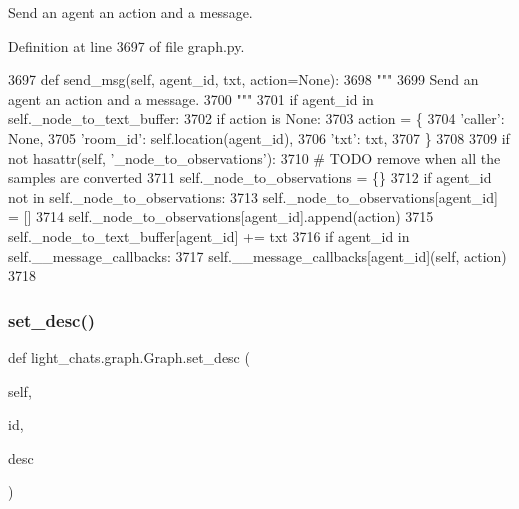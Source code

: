 \begin{DoxyVerb}Send an agent an action and a message.
\end{DoxyVerb}
 

Definition at line 3697 of file graph.\+py.


\begin{DoxyCode}
3697     \textcolor{keyword}{def }send\_msg(self, agent\_id, txt, action=None):
3698         \textcolor{stringliteral}{"""}
3699 \textcolor{stringliteral}{        Send an agent an action and a message.}
3700 \textcolor{stringliteral}{        """}
3701         \textcolor{keywordflow}{if} agent\_id \textcolor{keywordflow}{in} self.\_node\_to\_text\_buffer:
3702             \textcolor{keywordflow}{if} action \textcolor{keywordflow}{is} \textcolor{keywordtype}{None}:
3703                 action = \{
3704                     \textcolor{stringliteral}{'caller'}: \textcolor{keywordtype}{None},
3705                     \textcolor{stringliteral}{'room\_id'}: self.location(agent\_id),
3706                     \textcolor{stringliteral}{'txt'}: txt,
3707                 \}
3708 
3709             \textcolor{keywordflow}{if} \textcolor{keywordflow}{not} hasattr(self, \textcolor{stringliteral}{'\_node\_to\_observations'}):
3710                 \textcolor{comment}{# TODO remove when all the samples are converted}
3711                 self.\_node\_to\_observations = \{\}
3712             \textcolor{keywordflow}{if} agent\_id \textcolor{keywordflow}{not} \textcolor{keywordflow}{in} self.\_node\_to\_observations:
3713                 self.\_node\_to\_observations[agent\_id] = []
3714             self.\_node\_to\_observations[agent\_id].append(action)
3715             self.\_node\_to\_text\_buffer[agent\_id] += txt
3716         \textcolor{keywordflow}{if} agent\_id \textcolor{keywordflow}{in} self.\_\_message\_callbacks:
3717             self.\_\_message\_callbacks[agent\_id](self, action)
3718 
\end{DoxyCode}
\mbox{\label{classlight__chats_1_1graph_1_1Graph_a6039eea576e68156be7fcaa7a3929358}} 
\subsubsection{\texorpdfstring{set\+\_\+desc()}{set\_desc()}}
{\footnotesize\ttfamily def light\+\_\+chats.\+graph.\+Graph.\+set\+\_\+desc (\begin{DoxyParamCaption}\item[{}]{self,  }\item[{}]{id,  }\item[{}]{desc }\end{DoxyParamCaption})}



